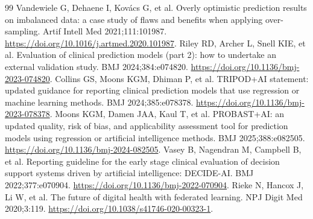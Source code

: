\begin{thebibliography}{99}
 Vandewiele G, Dehaene I, Kovács G, et al. Overly optimistic prediction results on imbalanced data: a case study of flaws and benefits when applying over-sampling. Artif Intell Med 2021;111:101987. \href{https://doi.org/10.1016/j.artmed.2020.101987}{https://doi.org/10.1016/j.artmed.2020.101987}.
 Riley RD, Archer L, Snell KIE, et al. Evaluation of clinical prediction models (part 2): how to undertake an external validation study. BMJ 2024;384:e074820. \href{https://doi.org/10.1136/bmj-2023-074820}{https://doi.org/10.1136/bmj-2023-074820}.
 Collins GS, Moons KGM, Dhiman P, et al. TRIPOD+AI statement: updated guidance for reporting clinical prediction models that use regression or machine learning methods. BMJ 2024;385:e078378. \href{https://doi.org/10.1136/bmj-2023-078378}{https://doi.org/10.1136/bmj-2023-078378}.
 Moons KGM, Damen JAA, Kaul T, et al. PROBAST+AI: an updated quality, risk of bias, and applicability assessment tool for prediction models using regression or artificial intelligence methods. BMJ 2025;388:e082505. \href{https://doi.org/10.1136/bmj-2024-082505}{https://doi.org/10.1136/bmj-2024-082505}.
 Vasey B, Nagendran M, Campbell B, et al. Reporting guideline for the early stage clinical evaluation of decision support systems driven by artificial intelligence: DECIDE-AI. BMJ 2022;377:e070904. \href{https://doi.org/10.1136/bmj-2022-070904}{https://doi.org/10.1136/bmj-2022-070904}.
 Rieke N, Hancox J, Li W, et al. The future of digital health with federated learning. NPJ Digit Med 2020;3:119. \href{https://doi.org/10.1038/s41746-020-00323-1}{https://doi.org/10.1038/s41746-020-00323-1}.
\end{thebibliography}
